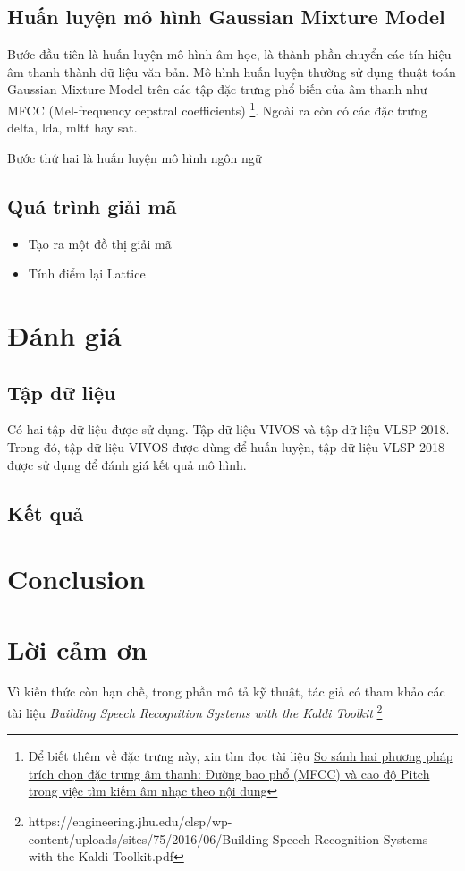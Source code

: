 \documentclass[11pt,a4paper]{article}
\begin{document}
\subsection{Huấn luyện mô hình Gaussian Mixture Model}

Bước đầu tiên là huấn luyện mô hình âm học, là thành phần chuyển các tín hiệu âm thanh thành dữ liệu văn bản.
Mô hình huấn luyện thường sử dụng thuật toán Gaussian Mixture Model trên các tập đặc trưng phổ biến của âm thanh như MFCC (Mel-frequency cepstral coefficients) \footnote{Để biết thêm về đặc trưng này, xin tìm đọc tài liệu \href{http://www.lrc.tnu.edu.vn/upload/collection/brief/41619_13520141527406.pdf}{So sánh hai phương pháp trích chọn đặc trưng âm thanh: Đường bao phổ (MFCC) và cao độ Pitch trong việc tìm kiếm âm nhạc theo nội dung}}. Ngoài ra còn có các đặc trưng delta, lda, mltt hay sat.

Bước thứ hai là huấn luyện mô hình ngôn ngữ

\subsection{Quá trình giải mã}

\begin{itemize}
  \item Tạo ra một đồ thị giải mã
  \item Tính điểm lại Lattice
\end{itemize}

\section{Đánh giá}

\subsection{Tập dữ liệu}

Có hai tập dữ liệu được sử dụng. Tập dữ liệu VIVOS và tập dữ liệu VLSP 2018. Trong đó, tập dữ liệu VIVOS được dùng để huấn luyện, tập dữ liệu VLSP 2018 được sử dụng để đánh giá kết quả mô hình.

\subsection{Kết quả}


\section{Conclusion}


\section{Lời cảm ơn}

Vì kiến thức còn hạn chế, trong phần mô tả kỹ thuật, tác giả có tham khảo các tài liệu \textit{Building Speech Recognition Systems with the Kaldi Toolkit} \footnote{https://engineering.jhu.edu/clsp/wp-content/uploads/sites/75/2016/06/Building-Speech-Recognition-Systems-with-the-Kaldi-Toolkit.pdf}



\end{document}
